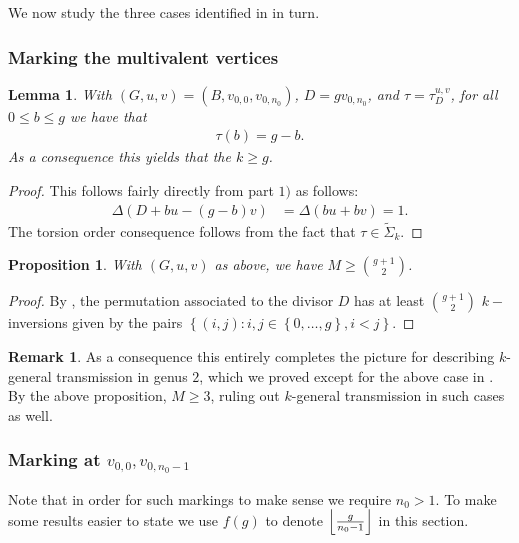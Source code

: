 \documentclass[11pt]{article}
\newtheorem{lemma}[theo]{Lemma}
\newtheorem{prop}[theo]{Proposition}
\theoremstyle{definition}
\newtheorem{rema}[theo]{Remark}
\numberwithin{equation}{section}
\newcommand{\eaf}[1]{\widetilde{\Sigma}_{#1}}
\newcommand{\set}[1]{\left\{{#1}\right\}}
\DeclarePairedDelimiter\floor{\lfloor}{\rfloor}
\newcommand{\tauD}{\tau^{u,v}_D}
\begin{document}
We now study the three cases identified in  in turn.

\subsubsection{Marking the multivalent vertices}\label{subsub-g+1}
\begin{lemma}\label{lem-TriangleInversionII}
    With $(G,u,v) = (B, v_{0,0},v_{0,n_0})$, $D = g v_{0,n_0}$, and $\tau = \tauD$, for all $0 \leq b \leq g$ we have that
    \begin{align*}
        \tau(b) = g-b.
    \end{align*}
    As a consequence this yields that the $k \geq g$.
\end{lemma}

\begin{proof}
    This follows fairly directly from  part $1)$ as follows:
    \begin{align*}
        \Delta(D+bu-(g-b)v) &= \Delta(bu+bv) = 1.
    \end{align*}
    The torsion order consequence follows from the fact that $\tau \in \eaf{k}$.
\end{proof}

\begin{prop}\label{prop-TriangleInversionNumber}
    With $(G,u,v)$ as above, we have $M \geq \binom{g+1}{2}$.
\end{prop}

\begin{proof}
    By , the permutation associated to the divisor $D$ has at least $\binom{g+1}{2}$ $k-$inversions given by the pairs $\set{(i,j):i,j \in \set{0,\dots,g}, i<j}$.
\end{proof}

\begin{rema}
    As a consequence this entirely completes the picture for describing $k$-general transmission in genus $2$, which we proved except for the above case in . By the above proposition, $M\geq 3$, ruling out $k$-general transmission in such cases as well.
\end{rema}

\subsubsection{\texorpdfstring{Marking at $v_{0,0},v_{0,n_0-1}$}{Marking at v\_0,0 and v\_0,n0-1}}
Note that in order for such markings to make sense we require $n_0>1$. To make some results easier to state we use $f(g)$ to denote $\floor*{ \frac{g}{n_0-1}}$ in this section.
\end{document}
